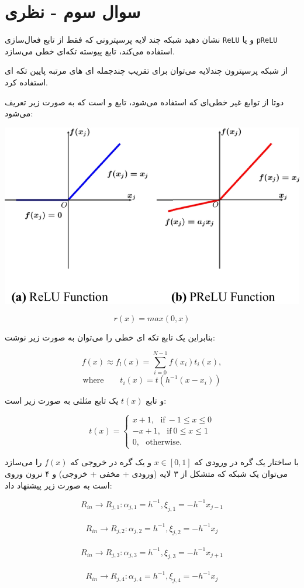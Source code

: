 \section{سوال سوم - نظری}

نشان دهید شبکه چند لایه پرسپترونی که فقط از تابع فعال‌سازی \texttt{ReLU} و یا \texttt{pReLU} استفاده می‌کند، تابع پیوسته تکه‌ای خطی می‌سازد.


\begin{qsolve}
از شبکه پرسپترون چند‌لایه می‌توان برای تقریب چند‌جمله ای های مرتبه پایین تکه ای استفاده کرد. \cite{ref1}

دوتا از توابع غیر خطی‌ای که استفاده می‌شود، تابع  و  است که به صورت زیر تعریف می‌شود:

	\begin{center}
		\includegraphics*[width=0.5\linewidth]{pics/img10.png}
		\label{توابع فعالساز رلو و پی رلو}
	\end{center}

	$$ r(x)=max(0, x) $$
	
	بنابراین یک تابع تکه ای خطی را می‌توان به صورت زیر نوشت:
	
	$$ f(x)\approx f_l(x)=\sum_{i=0}^{N-1} f(x_i)t_i(x), $$
	$$ \text{where} \qquad t_i(x)=t(h^{-1}(x-x_i)) $$
	
	و تابع $t(x)$ یک تابع مثلثی به صورت زیر است:
	
	$$
	t(x)=
	\begin{cases}
		x+1, \ \ \  \text{if} \ -1\le x \le 0 \\
		-x+1, \ \ \ \text{if} \ 0\le x \le 1 \\
		0,     \ \ \ \text{otherwise.}
	\end{cases}
	$$
	
	با ساختار یک گره در ورودی که $x \in [0,1]$ و یک گره در خروجی که $f(x)$ را می‌سازد می‌توان یک شبکه  که متشکل از ۳ لایه (ورودی + مخفی + خروجی) و ۴ نرون وروی است به صورت زیر پیشنهاد داد:
	
	$$ R_{in} \rightarrow R_{j, 1}: \alpha_{j, 1}=h^{-1}, \xi_{j,1}=-h^{-1}x_{j-1} $$ \\
	$$ R_{in} \rightarrow R_{j, 2}: \alpha_{j, 2}=h^{-1}, \xi_{j,2}=-h^{-1}x_{j} $$ \\
	$$ R_{in} \rightarrow R_{j, 3}: \alpha_{j, 3}=h^{-1}, \xi_{j,3}=-h^{-1}x_{j+1} $$ \\
	$$ R_{in} \rightarrow R_{j, 4}: \alpha_{j, 4}=h^{-1}, \xi_{j,4}=-h^{-1}x_{j} $$ \\
	
\end{qsolve}




